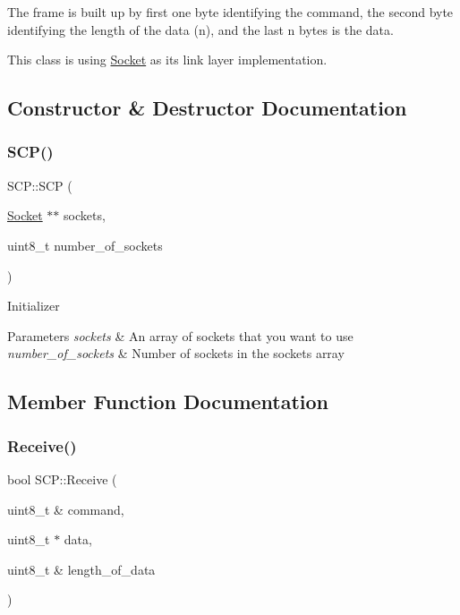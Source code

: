 The frame is built up by first one byte identifying the command, the second byte identifying the length of the data (n), and the last n bytes is the data.

This class is using \hyperlink{class_socket}{Socket} as its link layer implementation. 

\subsection{Constructor \& Destructor Documentation}
\hypertarget{class_s_c_p_aee0663a84b05a63993f1c3ff3a952319}{}\label{class_s_c_p_aee0663a84b05a63993f1c3ff3a952319} 
\subsubsection{\texorpdfstring{S\+C\+P()}{SCP()}}
{\footnotesize\ttfamily S\+C\+P\+::\+S\+CP (\begin{DoxyParamCaption}\item[{\hyperlink{class_socket}{Socket} $\ast$$\ast$}]{sockets,  }\item[{uint8\+\_\+t}]{number\+\_\+of\+\_\+sockets }\end{DoxyParamCaption})}

Initializer 
\begin{DoxyParams}{Parameters}
{\em sockets} & An array of sockets that you want to use \\
\hline
{\em number\+\_\+of\+\_\+sockets} & Number of sockets in the sockets array \\
\hline
\end{DoxyParams}


\subsection{Member Function Documentation}
\hypertarget{class_s_c_p_ab01a551b8edf803faaea5b0310345498}{}\label{class_s_c_p_ab01a551b8edf803faaea5b0310345498} 
\subsubsection{\texorpdfstring{Receive()}{Receive()}}
{\footnotesize\ttfamily bool S\+C\+P\+::\+Receive (\begin{DoxyParamCaption}\item[{uint8\+\_\+t \&}]{command,  }\item[{uint8\+\_\+t $\ast$}]{data,  }\item[{uint8\+\_\+t \&}]{length\+\_\+of\+\_\+data }\end{DoxyParamCaption})}

